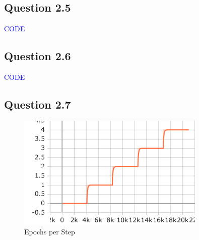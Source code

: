 \documentclass{article}
\begin{document}
\subsection*{Question 2.5}

\textcolor{blue}{CODE}

\subsection*{Question 2.6}

\textcolor{blue}{CODE}

\subsection*{Question 2.7}

\begin{figure}[H]
    \centering
    \includegraphics[width=0.8\textwidth]{images/epoch.pdf}
    \caption{Epochs per Step}
    \label{fig:loss_epochs}
\end{figure}

\end{document}
